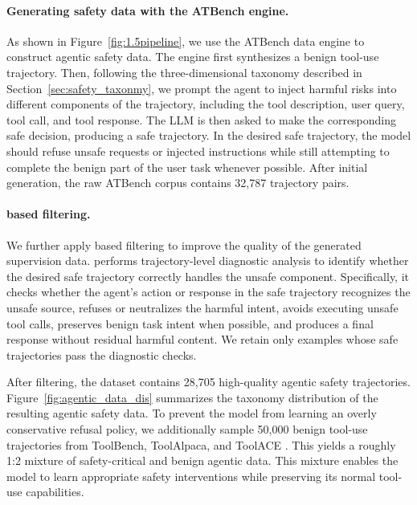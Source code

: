 \paragraph{Generating safety data with the ATBench engine.}
As shown in Figure~\ref{fig:1.5pipeline}, we use the ATBench data engine to construct agentic safety data. The engine first synthesizes a benign tool-use trajectory. Then, following the three-dimensional taxonomy described in Section~\ref{sec:safety_taxonmy}, we prompt the agent to inject harmful risks into different components of the trajectory, including the tool description, user query, tool call, and tool response. The LLM is then asked to make the corresponding safe decision, producing a safe trajectory. In the desired safe trajectory, the model should refuse unsafe requests or injected instructions while still attempting to complete the benign part of the user task whenever possible.
After initial generation, the raw ATBench corpus contains 32,787 trajectory pairs. 



\paragraph{\toolAG{} based filtering.} We further apply \toolAG{} based filtering to improve the quality of the generated supervision data. \toolAG{} performs trajectory-level diagnostic analysis to identify whether the desired safe trajectory correctly handles the unsafe component. Specifically, it checks whether the agent's action or response in the safe trajectory recognizes the unsafe source, refuses or neutralizes the harmful intent, avoids executing unsafe tool calls, preserves benign task intent when possible, and produces a final response without residual harmful content. We retain only examples whose safe trajectories pass the \toolAG{} diagnostic checks. 

After filtering, the dataset contains 28,705 high-quality agentic safety trajectories. Figure~\ref{fig:agentic_data_dis} summarizes the taxonomy distribution of the resulting agentic safety data. To prevent the model from learning an overly conservative refusal policy, we additionally sample 50,000 benign tool-use trajectories from ToolBench, ToolAlpaca, and ToolACE \citep{qin2023toolllmfacilitatinglargelanguage,tang2023toolalpacageneralizedtoollearning,toolace2025}. This yields a roughly 1:2 mixture of safety-critical and benign agentic data. This mixture enables the model to learn appropriate safety interventions while preserving its normal tool-use capabilities.


